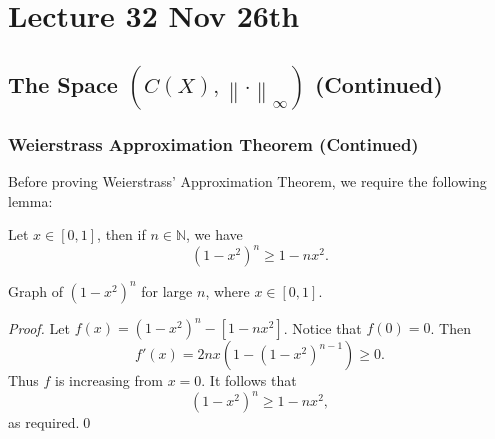 \documentclass[notoc,notitlepage]{tufte-book}
\newcommand{\norm}[1]{\left\| #1 \right\|}
\begin{document}



\chapter{Lecture 32 Nov 26th}%
\label{chp:lecture_32_nov_26th}

\section{The Space $(C(X), \norm\cdot_\infty)$ (Continued)}%
\label{sec:the_space_c_x_normcdot_infty_continued}

\subsection{Weierstrass Approximation Theorem (Continued)}%
\label{sub:weierstrass_approximation_theorem_continued}

Before proving Weierstrass' Approximation Theorem, we require the following lemma:

\begin{lemma}\label{lemma:lemma_for_weierstrass_approximation}
  Let $x \in [0, 1]$, then if $n \in \mathbb{N}$, we have
  \begin{equation*}
    (1 - x^2)^n \geq 1 - nx^2.
  \end{equation*}
  \begin{marginfigure}
    \centering
    \caption{Graph of $(1 - x^2)^n$ for large $n$, where $x \in [0, 1]$.}\label{fig:graph_of_1_x_2_n_for_large_n_where_x_in_0_1_}
  \end{marginfigure}
\end{lemma}

\begin{proof}
  Let $f(x) = (1 - x^2)^n - [ 1 - nx^2 ]$. Notice that $f(0) = 0$. Then
  \begin{equation*}
    f'(x) = 2nx\left( 1 - \left( 1 - x^2 \right)^{n - 1} \right) \geq 0.
  \end{equation*}
  Thus $f$ is increasing from $x = 0$. It follows that
  \begin{equation*}
    (1 - x^2)^n \geq 1 - nx^2,
  \end{equation*}
  as required.\qed\
\end{proof}
\end{document}
